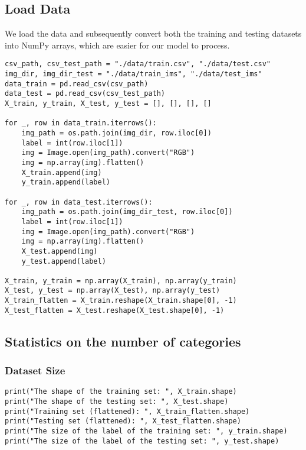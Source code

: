 \documentclass[a4paper,11pt]{article}
\begin{document}
\subsection{Load Data}
We load the data and subsequently convert both the training and testing datasets into NumPy arrays, which are easier for our model to process.

\begin{listing}[!ht]
\begin{verbatim}
csv_path, csv_test_path = "./data/train.csv", "./data/test.csv"
img_dir, img_dir_test = "./data/train_ims", "./data/test_ims"
data_train = pd.read_csv(csv_path)
data_test = pd.read_csv(csv_test_path)
X_train, y_train, X_test, y_test = [], [], [], []

for _, row in data_train.iterrows():
    img_path = os.path.join(img_dir, row.iloc[0])
    label = int(row.iloc[1])
    img = Image.open(img_path).convert("RGB")
    img = np.array(img).flatten()
    X_train.append(img)
    y_train.append(label)

for _, row in data_test.iterrows():
    img_path = os.path.join(img_dir_test, row.iloc[0])
    label = int(row.iloc[1])
    img = Image.open(img_path).convert("RGB")
    img = np.array(img).flatten()
    X_test.append(img)
    y_test.append(label)

X_train, y_train = np.array(X_train), np.array(y_train)
X_test, y_test = np.array(X_test), np.array(y_test)
X_train_flatten = X_train.reshape(X_train.shape[0], -1)
X_test_flatten = X_test.reshape(X_test.shape[0], -1)
\end{verbatim}
\label{listing:python}
\end{listing}

\subsection{Statistics on the number of categories}

\subsubsection{Dataset Size}

\begin{listing}[!ht]
\begin{verbatim}
print("The shape of the training set: ", X_train.shape)
print("The shape of the testing set: ", X_test.shape)
print("Training set (flattened): ", X_train_flatten.shape)
print("Testing set (flattened): ", X_test_flatten.shape)
print("The size of the label of the training set: ", y_train.shape)
print("The size of the label of the testing set: ", y_test.shape)
\end{verbatim}
\label{listing:python}
\end{listing}
\end{document}
